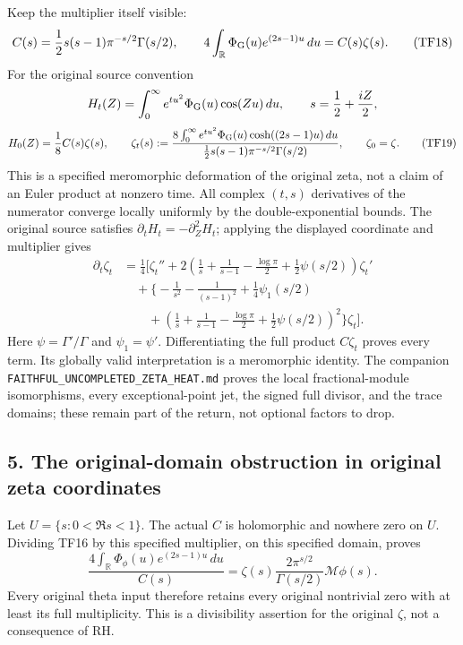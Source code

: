 \documentclass[
  10pt,
  a4paper,
]{article}
\begin{document}
Keep the multiplier itself visible: \[
C(s)=\frac12s(s-1)\pi^{-s/2}\Gamma(s/2),\qquad
4\int_{\mathbb R}\Phi_{\rm G}(u)e^{(2s-1)u}\,du=C(s)\zeta(s).
\tag{TF18}
\] For the original source convention \[
H_t(Z)=\int_0^\infty e^{tu^2}\Phi_{\rm G}(u)\cos(Zu)\,du,
\qquad s=\frac12+\frac{iZ}{2},
\] \[
H_0(Z)=\frac18 C(s)\zeta(s),\qquad
\zeta_t(s):=
\frac{8\int_0^\infty e^{tu^2}\Phi_{\rm G}(u)
\cosh((2s-1)u)\,du}
{\frac12s(s-1)\pi^{-s/2}\Gamma(s/2)},\qquad \zeta_0=\zeta.
\tag{TF19}
\] This is a specified meromorphic deformation of the original zeta, not
a claim of an Euler product at nonzero time. All complex \((t,s)\)
derivatives of the numerator converge locally uniformly by the
double-exponential bounds. The original source satisfies
\(\partial_tH_t=-\partial_Z^2H_t\); applying the displayed coordinate
and multiplier gives \[
\begin{aligned}
\partial_t\zeta_t&=\frac14\bigg[
\zeta_t''+2\left(\frac1s+\frac1{s-1}-\frac{\log\pi}{2}
+\frac12\psi(s/2)\right)\zeta_t'\\
&\quad+\bigg\{-\frac1{s^2}-\frac1{(s-1)^2}+\frac14\psi_1(s/2)\\
&\qquad
+\left(\frac1s+\frac1{s-1}-\frac{\log\pi}{2}
+\frac12\psi(s/2)\right)^2\bigg\}\zeta_t\bigg].
\end{aligned}
\tag{TF20}
\] Here \(\psi=\Gamma'/\Gamma\) and \(\psi_1=\psi'\). Differentiating
the full product \(C\zeta_t\) proves every term. Its globally valid
interpretation is a meromorphic identity. The companion
\texttt{FAITHFUL\_\allowbreak{}UNCOMPLETED\_\allowbreak{}ZETA\_\allowbreak{}HEAT.\allowbreak{}md} proves the local
fractional-module isomorphisms, every exceptional-point jet, the signed
full divisor, and the trace domains; these remain part of the return,
not optional factors to drop.

\subsection{5. The original-domain obstruction in original zeta
coordinates}\label{the-original-domain-obstruction-in-original-zeta-coordinates}

Let \(U=\{s:0<\Re s<1\}\). The actual \(C\) is holomorphic and nowhere
zero on \(U\). Dividing TF16 by this specified multiplier, on this
specified domain, proves \[
\frac{4\int_{\mathbb R}\Phi_\phi(u)e^{(2s-1)u}\,du}{C(s)}
=\zeta(s)\frac{2\pi^{s/2}}{\Gamma(s/2)}\mathcal M\phi(s).
\tag{TF21}
\] Every original theta input therefore retains every original
nontrivial zero with at least its full multiplicity. This is a
divisibility assertion for the original \(\zeta\), not a consequence of
RH.
\end{document}
